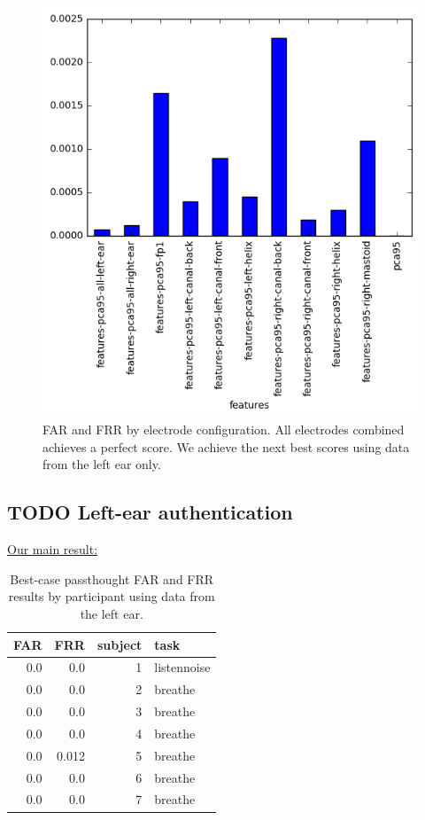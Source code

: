 \documentclass[letterpaper,twocolumn,10pt]{article}
\begin{document}
\begin{figure}[htbp]
\centering
\includegraphics[width=.9\linewidth]{./figures/mean-far-by-electrode-config.png}
\caption{FAR and FRR by electrode configuration. All electrodes combined achieves a perfect score. We achieve the next best scores using data from the left ear only.}
\end{figure}



\subsection{{\bfseries\sffamily TODO} Left-ear authentication}
\label{sec:org82cbcf4}

\underline{Our main result:}

\begin{table}[h]
\begin{center}
\begin{tabular}{rrrl}
FAR & FRR & subject & task\\
\hline
0.0 & 0.0 & 1 & listennoise\\
0.0 & 0.0 & 2 & breathe\\
0.0 & 0.0 & 3 & breathe\\
0.0 & 0.0 & 4 & breathe\\
0.0 & 0.012 & 5 & breathe\\
0.0 & 0.0 & 6 & breathe\\
0.0 & 0.0 & 7 & breathe\\
\end{tabular}
\end{center}
\caption{Best-case passthought FAR and FRR results by participant using data from the left ear.}
\end{table}
\end{document}

